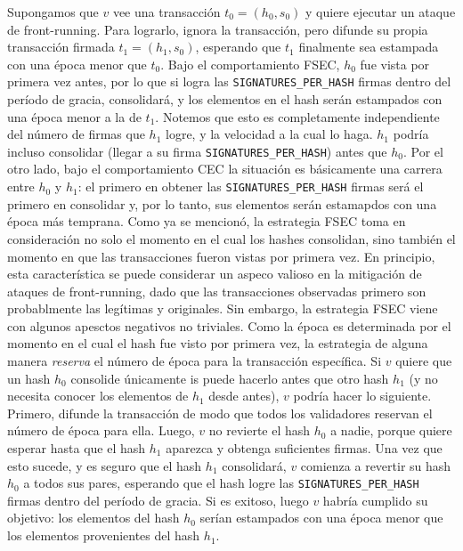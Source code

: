 Supongamos que $v$ vee una transacción $t_0 = (h_0, s_0)$ y quiere ejecutar un ataque de front-running.
Para lograrlo, ignora la transacción, pero difunde su propia transacción firmada $t_1 = (h_1, s_0)$,
esperando que $t_1$ finalmente sea estampada con una época menor que $t_0$.
%
Bajo el comportamiento FSEC, $h_0$ fue vista por primera vez antes, por lo que si logra las
\texttt{SIGNATURES\_PER\_HASH} firmas dentro del período de gracia, consolidará, y los elementos
en el hash serán estampados con una época menor a la de $t_1$.
%
Notemos que esto es completamente independiente del número de firmas que $h_1$ logre, y la velocidad
a la cual lo haga. $h_1$ podría incluso consolidar (llegar a su firma \texttt{SIGNATURES\_PER\_HASH})
antes que $h_0$.
%
Por el otro lado, bajo el comportamiento CEC la situación es básicamente una carrera entre $h_0$ y
$h_1$: el primero en obtener las \texttt{SIGNATURES\_PER\_HASH} firmas será el primero en consolidar y,
por lo tanto, sus elementos serán estamapdos con una época más temprana.
%
Como ya se mencionó, 
la estrategia FSEC toma en consideración no solo el momento en el cual los hashes consolidan, sino
también el momento en que las transacciones fueron vistas por primera vez.
%
En principio, esta característica se puede considerar un aspeco valioso en la mitigación de ataques
de front-running, dado que las transacciones observadas primero son probablmente las legítimas y
originales.
Sin embargo, la estrategia FSEC viene con algunos apesctos negativos no triviales.
%
Como la época es determinada por el momento en el cual el hash fue visto por primera vez, 
la estrategia de alguna manera \textit{reserva} el número de época para la transacción específica.
Si $v$ quiere que un hash $h_0$ consolide únicamente is puede hacerlo antes que otro hash
$h_1$ (y no necesita conocer los elementos de $h_1$ desde antes), $v$ podría hacer lo siguiente.
%
Primero, difunde la transacción de modo que todos los validadores reservan el número de época para ella.
%
Luego, $v$ no revierte el hash $h_0$ a nadie, porque quiere esperar hasta que el hash $h_1$ aparezca
y obtenga suficientes firmas.
%
Una vez que esto sucede, y es seguro que el hash $h_1$ consolidará, $v$ comienza a revertir su hash
$h_0$ a todos sus pares, esperando que el hash logre las \texttt{SIGNATURES\_PER\_HASH} firmas
dentro del período de gracia.
Si es exitoso, luego $v$ habría cumplido su objetivo: los elementos del hash $h_0$ serían estampados
con una época menor que los elementos provenientes del hash $h_1$.
%

